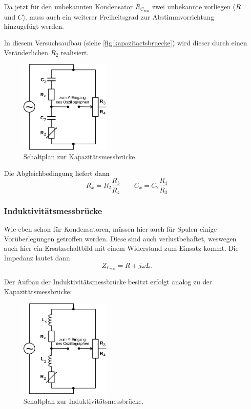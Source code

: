 Da jetzt für den unbekannten Kondensator $R_{C_\text{real}}$ zwei unbekannte vorliegen ($R$ und $C$), muss 
auch ein weiterer Freiheitsgrad zur Abstimmvorrichtung hinzugefügt werden.

In diesem Versuchsaufbau (siehe \autoref{fig:kapazitaetsbruecke}) wird dieser durch einen Veränderlichen $R_2$
realisiert.
\begin{figure}[H]
	\centering
	\includegraphics[width=0.4\textwidth]{bilder/kapazitaetsbruecke.png}
	\caption{Schaltplan zur Kapazitätsmessbrücke.}
	\label{fig:kapazitaetsbruecke}
\end{figure}

Die Abgleichbedingung liefert dann
\begin{equation}
	R_x = R_2 \frac{R_3}{R_4}
	\qquad
	C_x = C_2 \frac{R_4}{R_3}
	\label{eqn:values-kapazitaeten}
\end{equation}

\subsubsection{Induktivitätsmessbrücke}
\label{sec:theorie-induktivitätsmessbrücke}

Wie eben schon für Kondensatoren, müssen hier auch für Spulen einige Vorüberlegungen getroffen werden.
Diese sind auch verlustbehaftet, weswegen auch hier ein Ersatzschaltbild mit einem Widerstand zum Einsatz kommt.
Die Impedanz lautet dann
\begin{equation}
	Z_{L_\text{real}} = R + j \omega L.
	\label{eqn:reale-induktivitaet}
\end{equation}

Der Aufbau der Induktivitätsmessbrücke besitzt erfolgt analog zu der Kapazitätsmessbrücke:
\begin{figure}[H]
	\centering
	\includegraphics[width=0.4\textwidth]{bilder/induktivitaetsbruecke.png}
	\caption{Schaltplan zur Induktivitätsmessbrücke.}
	\label{fig:induktivitaetsbruecke}
\end{figure}

